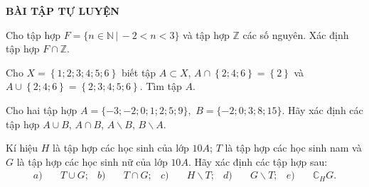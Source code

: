 \begin{center}
\textbf{BÀI TẬP TỰ LUYỆN}
\end{center}
\begin{bt}%
	Cho tập hợp $F=\{n\in\mathbb{N}\, | \, -2 <n<3\}$ và tập hợp $\mathbb{Z}$ các số nguyên. Xác định tập hợp $F\cap \mathbb{Z}$.
\end{bt}
\begin{bt}%
	Cho $X=\left\{1; 2; 3; 4; 5; 6\right\}$ biết tập $A\subset X$, $A\cap \left\{2; 4; 6\right\}=\left\{2\right\}$  và $A\cup \left\{2; 4; 6\right\}=\left\{2; 3; 4; 5; 6\right\}$. Tìm tập $A$. 
\end{bt}
\begin{bt}%
	Cho hai tập hợp
	$A=\{-3; -2; 0; 1; 2; 5;9\},$ $B=\{-2; 0; 3; 8; 15 \}.$
	Hãy xác định các tập hợp $A\cup B$, $A\cap B$, $A\backslash B$, $B\backslash A$.
\end{bt}
\begin{bt}%
	Kí hiệu $H$ là tập hợp các học sinh của lớp $10A$; $T$ là tập hợp các học sinh nam và $G$ là tập hợp các học sinh nữ của lớp $10A$.
	Hãy xác định các tập hợp sau:
	\begin{align*}
	a)&\quad T\cup G;
	&b)&\quad T\cap G;
	&c)&\quad H\backslash T;
	&d)&\quad G\backslash T;
	&e)&\quad \mathbb{C}_HG.
	\end{align*}
\end{bt}
